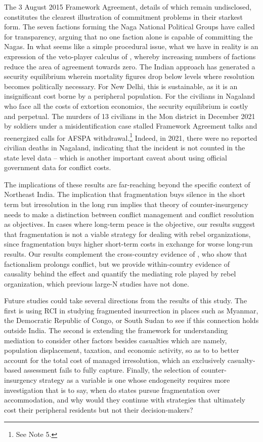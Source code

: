 \documentclass[12pt,a4paper]{article}
\begin{document}
The 3 August 2015 Framework Agreement, details of which remain undisclosed, constitutes the clearest illustration of commitment problems in their starkest form. The seven factions forming the Naga National Political Groups have called for transparency, arguing that no one faction alone is capable of committing the Nagas. In what seems like a simple procedural issue, what we have in reality is an expression of the veto-player calculus of \citet{cunningham2006,cunningham2009}, whereby increasing numbers of factions reduce the area of agreement towards zero. The Indian approach has generated a security equilibrium wherein mortality figures drop below levels where resolution becomes politically necessary. For New Delhi, this is sustainable, as it is an insignificant cost borne by a peripheral population. For the civilians in Nagaland who face all the costs of extortion economics, the security equilibrium is costly and perpetual. The murders of 13 civilians in the Mon district in December 2021 by soldiers under a misidentification case stalled Framework Agreement talks and reenergized calls for AFSPA withdrawal.\footnote{See Note 5.} Indeed, in 2021, there were no reported civilian deaths in Nagaland, indicating that the incident is not counted in the state level data – which is another important caveat about using official government data for conflict costs.

The implications of these results are far-reaching beyond the specific context of Northeast India. The implication that fragmentation buys silence in the short term but irresolution in the long run implies that theory of counter-insurgency needs to make a distinction between conflict management and conflict resolution as objectives. In cases where long-term peace is the objective, our results suggest that fragmentation is not a viable strategy for dealing with rebel organizations, since fragmentation buys higher short-term costs in exchange for worse long-run results. Our results complement the cross-country evidence of \citet{cunningham2009}, who show that factionalism prolongs conflict, but we provide within-country evidence of causality behind the effect and quantify the mediating role played by rebel organization, which previous large-N studies have not done.

Future studies could take several directions from the results of this study. The first is using RCI in studying fragmented insurrection in places such as Myanmar, the Democratic Republic of Congo, or South Sudan to see if this connection holds outside India. The second is extending the framework for understanding mediation to consider other factors besides casualties which are namely, population displacement, taxation, and economic activity, so as to to better account for the total cost of managed irresolution, which an exclusively casualty-based assessment fails to fully capture. Finally, the selection of counter-insurgency strategy as a variable is one whose endogeneity requires more investigation that is to say, when do states pursue fragmentation over accommodation, and why would they continue with strategies that ultimately cost their peripheral residents but not their decision-makers?
\end{document}
